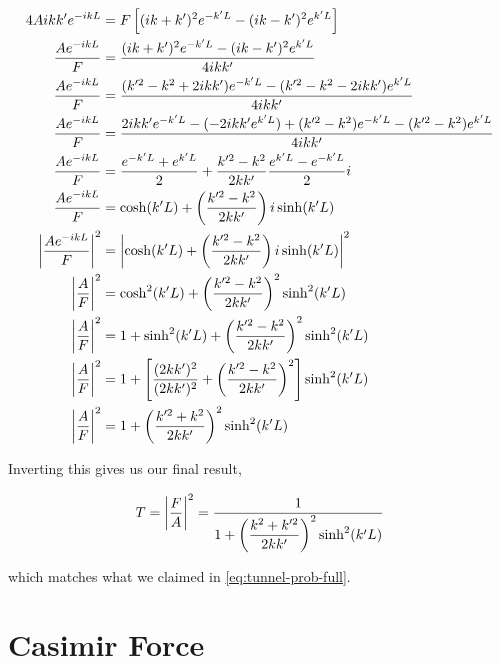 \begin{align*}
	4Aikk'e^{-ikL} &= F \left[(ik+k')^2e^{-k'L} - (ik-k')^2e^{k'L}\right] \\
	\frac{Ae^{-ikL}}{F} &= \frac{(ik+k')^2e^{-k'L} - (ik-k')^2e^{k'L}}{4ikk'} \\
	\frac{Ae^{-ikL}}{F} &= \frac{(k^{\prime 2}-k^2 + 2ikk')e^{-k'L} - (k^{\prime 2} - k^2 - 2ikk')e^{k'L}}{4ikk'} \\
	\frac{Ae^{-ikL}}{F} &= \frac{2ikk'e^{-k'L} - (-2ikk'e^{k'L}) + (k^{\prime 2}-k^2)e^{-k'L} - (k^{\prime 2} - k^2)e^{k'L}}{4ikk'} \\
	\frac{Ae^{-ikL}}{F} &= \frac{e^{-k'L} + e^{k'L}}{2} + \frac{k^{\prime 2}-k^2}{2kk'}\frac{e^{k'L} - e^{-k'L}}{2}i \\
	\frac{Ae^{-ikL}}{F} &= \cosh(k'L) + \left(\frac{k^{\prime 2}-k^2}{2kk'}\right)i\sinh(k'L) \\
	\abs{\frac{Ae^{-ikL}}{F}}^2 &= \abs{\cosh(k'L) + \left(\frac{k^{\prime 2}-k^2}{2kk'}\right)i\sinh(k'L)}^2 \\
	\abs{\frac{A}{F}}^2 &= \cosh^2(k'L) + \left(\frac{k^{\prime 2}-k^2}{2kk'}\right)^2\sinh^2(k'L) \\
	\abs{\frac{A}{F}}^2 &= 1 + \sinh^2(k'L) + \left(\frac{k^{\prime 2}-k^2}{2kk'}\right)^2\sinh^2(k'L) \\
	\abs{\frac{A}{F}}^2 &= 1 + \left[ \frac{(2kk')^2}{(2kk')^2} + \left(\frac{k^{\prime 2}-k^2}{2kk'}\right)^2\right]\sinh^2(k'L) \\
	\abs{\frac{A}{F}}^2 &= 1 + \left(\frac{k^{\prime 2}+k^2}{2kk'}\right)^2\sinh^2(k'L) 
\end{align*}

Inverting this gives us our final result,

\begin{equation}
	T = \abs{\frac{F}{A}}^2  = \frac{1}{1 + \left(\dfrac{k^2+k^{\prime 2}}{2kk'}\right)^2 \sinh^2(k'L)}
\end{equation}

\noindent which matches what we claimed in \autoref{eq:tunnel-prob-full}.


\section{Casimir Force} \label{sec:casimir-deriv}

